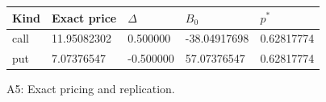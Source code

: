 \begin{center}
\small
\begin{tabular}{lllll}
\toprule
Kind & Exact price & $\Delta$ & $B_0$ & $p^*$\\
\midrule
call & 11.95082302 & 0.500000 & -38.04917698 & 0.62817774\\
put & 7.07376547 & -0.500000 & 57.07376547 & 0.62817774\\
\bottomrule
\end{tabular}
\par\smallskip A5: Exact pricing and replication.
\end{center}